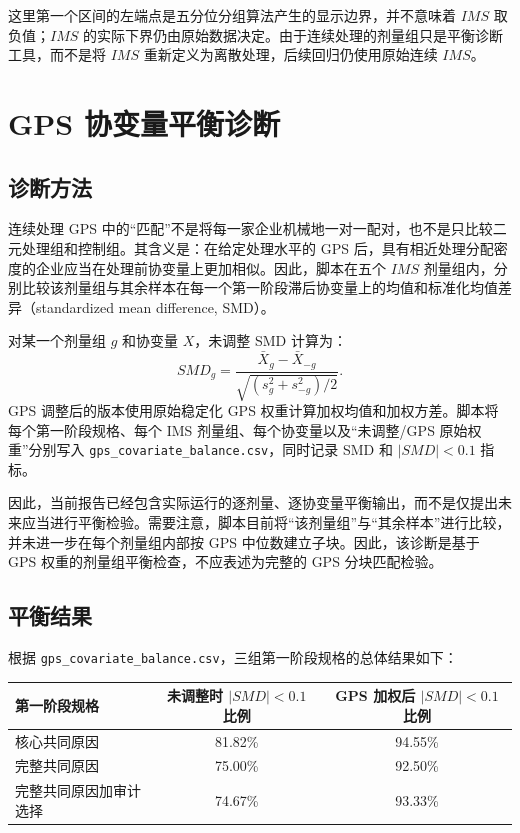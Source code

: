 \documentclass[11pt]{article}
\begin{document}
这里第一个区间的左端点是五分位分组算法产生的显示边界，并不意味着 $IMS$ 取负值；$IMS$ 的实际下界仍由原始数据决定。由于连续处理的剂量组只是平衡诊断工具，而不是将 $IMS$ 重新定义为离散处理，后续回归仍使用原始连续 $IMS$。

\section{GPS 协变量平衡诊断}

\subsection{诊断方法}

连续处理 GPS 中的“匹配”不是将每一家企业机械地一对一配对，也不是只比较二元处理组和控制组。其含义是：在给定处理水平的 GPS 后，具有相近处理分配密度的企业应当在处理前协变量上更加相似。因此，脚本在五个 $IMS$ 剂量组内，分别比较该剂量组与其余样本在每一个第一阶段滞后协变量上的均值和标准化均值差异（standardized mean difference, SMD）。

对某一个剂量组 $g$ 和协变量 $X$，未调整 SMD 计算为：
\[
SMD_g=\frac{\bar X_g-\bar X_{-g}}
{\sqrt{(s_g^2+s_{-g}^2)/2}}.
\]
GPS 调整后的版本使用原始稳定化 GPS 权重计算加权均值和加权方差。脚本将每个第一阶段规格、每个 IMS 剂量组、每个协变量以及“未调整/GPS 原始权重”分别写入 \texttt{gps\_covariate\_balance.csv}，同时记录 SMD 和 $|SMD|<0.1$ 指标。

因此，当前报告已经包含实际运行的逐剂量、逐协变量平衡输出，而不是仅提出未来应当进行平衡检验。需要注意，脚本目前将“该剂量组”与“其余样本”进行比较，并未进一步在每个剂量组内部按 GPS 中位数建立子块。因此，该诊断是基于 GPS 权重的剂量组平衡检查，不应表述为完整的 GPS 分块匹配检验。

\subsection{平衡结果}

根据 \texttt{gps\_covariate\_balance.csv}，三组第一阶段规格的总体结果如下：
\begin{table}[htbp]
\centering
\begin{tabular}{lcc}
\toprule
第一阶段规格 & 未调整时 $|SMD|<0.1$ 比例 & GPS 加权后 $|SMD|<0.1$ 比例 \\
\midrule
核心共同原因 & 81.82\% & 94.55\% \\
完整共同原因 & 75.00\% & 92.50\% \\
完整共同原因加审计选择 & 74.67\% & 93.33\% \\
\bottomrule
\end{tabular}
\end{table}
\end{document}
